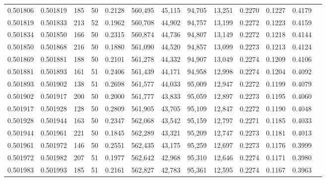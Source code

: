 \begin{tabular}{rrrrrrrrrrrrr}
0.501806 & 0.501819 & 185 &  50 &                                     0.2128 & 560,495 &  45,115 &  94,705 &  13,251 & 0.2270 & 0.1227 & 0.4179 \\
0.501819 & 0.501833 & 213 &  52 &                                     0.1962 & 560,708 &  44,902 &  94,757 &  13,199 & 0.2272 & 0.1223 & 0.4159 \\
0.501834 & 0.501850 & 166 &  50 &                                     0.2315 & 560,874 &  44,736 &  94,807 &  13,149 & 0.2272 & 0.1218 & 0.4144 \\
0.501850 & 0.501868 & 216 &  50 &                                     0.1880 & 561,090 &  44,520 &  94,857 &  13,099 & 0.2273 & 0.1213 & 0.4124 \\
0.501869 & 0.501881 & 188 &  50 &                                     0.2101 & 561,278 &  44,332 &  94,907 &  13,049 & 0.2274 & 0.1209 & 0.4106 \\
0.501881 & 0.501893 & 161 &  51 &                                     0.2406 & 561,439 &  44,171 &  94,958 &  12,998 & 0.2274 & 0.1204 & 0.4092 \\
0.501893 & 0.501902 & 138 &  51 &                                     0.2698 & 561,577 &  44,033 &  95,009 &  12,947 & 0.2272 & 0.1199 & 0.4079 \\
0.501902 & 0.501917 & 200 &  50 &                                     0.2000 & 561,777 &  43,833 &  95,059 &  12,897 & 0.2273 & 0.1195 & 0.4060 \\
0.501917 & 0.501928 & 128 &  50 &                                     0.2809 & 561,905 &  43,705 &  95,109 &  12,847 & 0.2272 & 0.1190 & 0.4048 \\
0.501928 & 0.501944 & 163 &  50 &                                     0.2347 & 562,068 &  43,542 &  95,159 &  12,797 & 0.2271 & 0.1185 & 0.4033 \\
0.501944 & 0.501961 & 221 &  50 &                                     0.1845 & 562,289 &  43,321 &  95,209 &  12,747 & 0.2273 & 0.1181 & 0.4013 \\
0.501961 & 0.501972 & 146 &  50 &                                     0.2551 & 562,435 &  43,175 &  95,259 &  12,697 & 0.2273 & 0.1176 & 0.3999 \\
0.501972 & 0.501982 & 207 &  51 &                                     0.1977 & 562,642 &  42,968 &  95,310 &  12,646 & 0.2274 & 0.1171 & 0.3980 \\
0.501983 & 0.501993 & 185 &  51 &                                     0.2161 & 562,827 &  42,783 &  95,361 &  12,595 & 0.2274 & 0.1167 & 0.3963 \\

\end{tabular}
